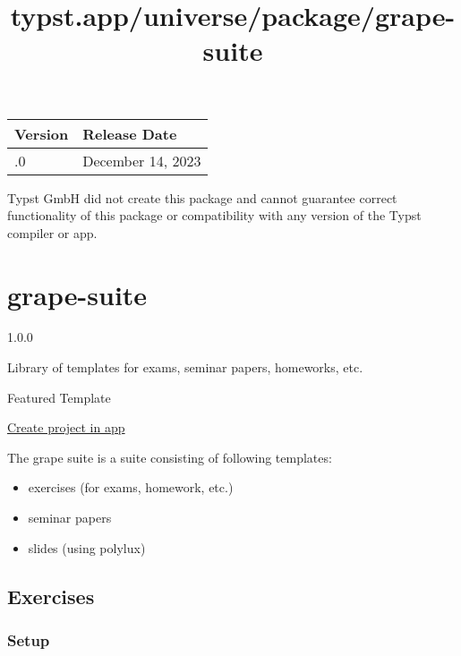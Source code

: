\begin{longtable}[]{@{}ll@{}}
\toprule\noalign{}
Version & Release Date \\
\midrule\noalign{}
\endhead
\bottomrule\noalign{}
\endlastfoot
0.1.0 & December 14, 2023 \\
\end{longtable}

Typst GmbH did not create this package and cannot guarantee correct
functionality of this package or compatibility with any version of the
Typst compiler or app.


\title{typst.app/universe/package/grape-suite}

\label{banner}
\label{template-thumbnail}

\section{grape-suite}\label{grape-suite}

{ 1.0.0 }

Library of templates for exams, seminar papers, homeworks, etc.

{ } Featured Template

\href{/app?template=grape-suite&version=1.0.0}{Create project in app}

\label{readme}
The grape suite is a suite consisting of following templates:

\begin{itemize}
\item
  exercises (for exams, homework, etc.)
\item
  seminar papers
\item
  slides (using polylux)
\end{itemize}

\subsection{Exercises}\label{exercises}

\subsubsection{Setup}\label{setup}

